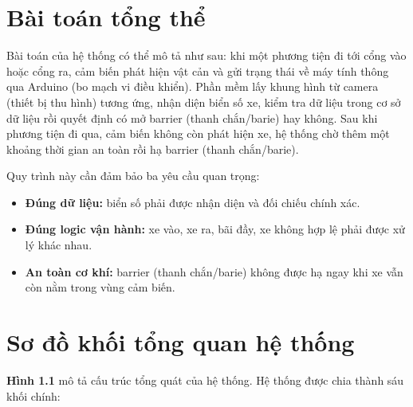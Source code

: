\documentclass[a4paper,14pt]{extreport}
\begin{document}
\section{Bài toán tổng thể}

Bài toán của hệ thống có thể mô tả như sau: khi một phương tiện đi tới cổng vào hoặc cổng ra, cảm biến phát hiện vật cản và gửi trạng thái về máy tính thông qua Arduino (bo mạch vi điều khiển). Phần mềm lấy khung hình từ camera (thiết bị thu hình) tương ứng, nhận diện biển số xe, kiểm tra dữ liệu trong cơ sở dữ liệu rồi quyết định có mở barrier (thanh chắn/barie) hay không. Sau khi phương tiện đi qua, cảm biến không còn phát hiện xe, hệ thống chờ thêm một khoảng thời gian an toàn rồi hạ barrier (thanh chắn/barie).

Quy trình này cần đảm bảo ba yêu cầu quan trọng:

\begin{itemize}[leftmargin=2em]
  \item \textbf{Đúng dữ liệu:} biển số phải được nhận diện và đối chiếu chính xác.
  \item \textbf{Đúng logic vận hành:} xe vào, xe ra, bãi đầy, xe không hợp lệ phải được xử lý khác nhau.
  \item \textbf{An toàn cơ khí:} barrier (thanh chắn/barie) không được hạ ngay khi xe vẫn còn nằm trong vùng cảm biến.
\end{itemize}

\section{Sơ đồ khối tổng quan hệ thống}

\textbf{Hình 1.1} mô tả cấu trúc tổng quát của hệ thống. Hệ thống được chia thành sáu khối chính:
\end{document}
